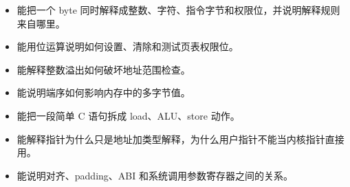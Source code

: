 \begin{rubricbox}
\begin{itemize}
\tightlist
\item 能把一个 byte 同时解释成整数、字符、指令字节和权限位，并说明解释规则来自哪里。
\item 能用位运算说明如何设置、清除和测试页表权限位。
\item 能解释整数溢出如何破坏地址范围检查。
\item 能说明端序如何影响内存中的多字节值。
\item 能把一段简单 C 语句拆成 load、ALU、store 动作。
\item 能解释指针为什么只是地址加类型解释，为什么用户指针不能当内核指针直接用。
\item 能说明对齐、padding、ABI 和系统调用参数寄存器之间的关系。
\end{itemize}
\end{rubricbox}
